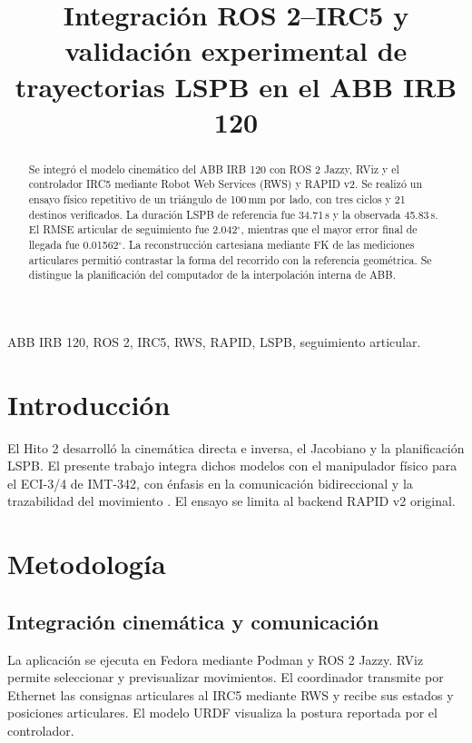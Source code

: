 \documentclass[conference]{IEEEtran}
\begin{document}
\title{Integración ROS 2--IRC5 y validación experimental de trayectorias LSPB en el ABB IRB 120}
\author{
\and
{}
}
\maketitle
\begin{abstract}
Se integró el modelo cinemático del ABB IRB 120 con ROS 2 Jazzy, RViz y el controlador IRC5 mediante Robot Web Services (RWS) y RAPID v2. Se realizó un ensayo físico repetitivo de un triángulo de 100\,mm por lado, con tres ciclos y 21 destinos verificados. La duración LSPB de referencia fue 34.71\,s y la observada 45.83\,s. El RMSE articular de seguimiento fue 2.042$^\circ$, mientras que el mayor error final de llegada fue 0.01562$^\circ$. La reconstrucción cartesiana mediante FK de las mediciones articulares permitió contrastar la forma del recorrido con la referencia geométrica. Se distingue la planificación del computador de la interpolación interna de ABB.
\end{abstract}
\begin{IEEEkeywords}
ABB IRB 120, ROS 2, IRC5, RWS, RAPID, LSPB, seguimiento articular.
\end{IEEEkeywords}
\section{Introducción}
El Hito 2 desarrolló la cinemática directa e inversa, el Jacobiano y la planificación LSPB. El presente trabajo integra dichos modelos con el manipulador físico para el ECI-3/4 de IMT-342, con énfasis en la comunicación bidireccional y la trazabilidad del movimiento \cite{s12,s14}. El ensayo se limita al backend RAPID v2 original.
\section{Metodología}
\subsection{Integración cinemática y comunicación}
La aplicación se ejecuta en Fedora mediante Podman y ROS 2 Jazzy. RViz permite seleccionar y previsualizar movimientos. El coordinador transmite por Ethernet las consignas articulares al IRC5 mediante RWS y recibe sus estados y posiciones articulares. El modelo URDF visualiza la postura reportada por el controlador.
\end{document}
